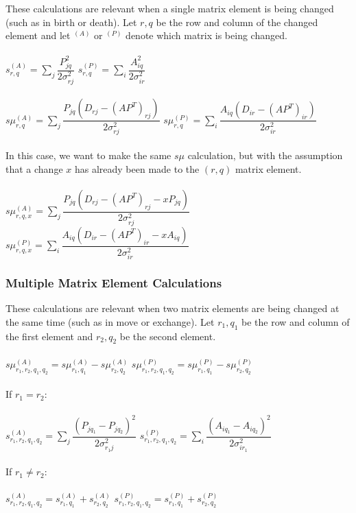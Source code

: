 \documentclass[]{article}
\begin{document}
These calculations are relevant when a single matrix element is being changed (such as in birth or death). Let $r,q$ be the row and column of the changed element and let $^{(A)}$ or $^{(P)}$ denote which matrix is being changed.\\
\\
$s_{r,q}^{(A)} = \sum_j \dfrac{P_{jq}^2}{2\sigma_{rj}^2}$
\hspace{59.8mm}
$s_{r,q}^{(P)} = \sum_i \dfrac{A_{iq}^2}{2\sigma_{ir}^2}$\\
\\
$s\mu_{r,q}^{(A)} = \sum_j \dfrac{P_{jq}(D_{rj} - (AP^T)_{rj})}{2\sigma_{rj}^2}$
\hspace{33mm}
$s\mu_{r,q}^{(P)} = \sum_i \dfrac{A_{iq}(D_{ir} - (AP^T)_{ir})}{2\sigma_{ir}^2}$\\
\\
In this case, we want to make the same $s\mu$ calculation, but with the assumption that a change $x$ has already been made to the $(r,q)$ matrix element.\\
\\
$s\mu_{r,q,x}^{(A)} = \sum_j \dfrac{P_{jq}(D_{rj} - (AP^T)_{rj} - xP_{jq})}{2\sigma_{rj}^2}$
\hspace{20mm}
$s\mu_{r,q,x}^{(P)} = \sum_i \dfrac{A_{iq}(D_{ir} - (AP^T)_{ir} - xA_{iq})}{2\sigma_{ir}^2}$

\subsubsection{Multiple Matrix Element Calculations}

These calculations are relevant when two matrix elements are being changed at the same time (such as in move or exchange). Let $r_1,q_1$ be the row and column of the first element and $r_2,q_2$ be the second element.\\
\\
$s\mu_{r_1,r_2,q_1,q_2}^{(A)} = s\mu_{r_1,q_1}^{(A)} - s\mu_{r_2,q_2}^{(A)}$
\hspace{37mm}
$s\mu_{r_1,r_2,q_1,q_2}^{(P)} = s\mu_{r_1,q_1}^{(P)} - s\mu_{r_2,q_2}^{(P)}$\\
\\
If $r_1 = r_2$:\\
\\
$s_{r_1,r_2,q_1,q_2}^{(A)} = \sum_j \dfrac{(P_{jq_1} - P_{jq_2})^2}{2\sigma_{r_1j}^2}$
\hspace{36mm}
$s_{r_1,r_2,q_1,q_2}^{(P)} = \sum_i \dfrac{(A_{iq_1} - A_{iq_2})^2}{2\sigma_{ir_1}^2}$\\
\\
If $r_1 \neq r_2$:\\
\\
$s_{r_1,r_2,q_1,q_2}^{(A)} = s_{r_1,q_1}^{(A)} + s_{r_2,q_2}^{(A)}$
\hspace{43.5mm}
$s_{r_1,r_2,q_1,q_2}^{(P)} = s_{r_1,q_1}^{(P)} + s_{r_2,q_2}^{(P)}$
\end{document}
